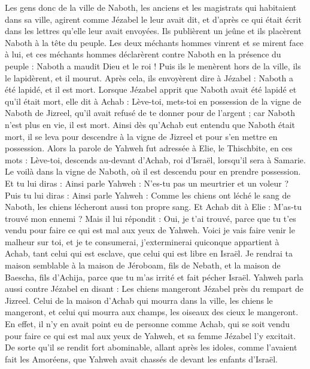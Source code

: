 \begin{multicols}{2}
Les gens donc de la ville de Naboth, les anciens et les magistrats qui habitaient dans sa ville, agirent comme Jézabel le leur avait dit, et d’après ce qui était écrit dans les lettres qu'elle leur avait envoyées.
Ils publièrent un jeûne et ils placèrent Naboth à la tête du peuple.
Les deux méchants hommes vinrent et se mirent face à lui, et ces méchants hommes déclarèrent contre Naboth en la présence du peuple : Naboth a maudit Dieu et le roi ! Puis ils le menèrent hors de la ville, ils le lapidèrent, et il mourut.
Après cela, ils envoyèrent dire à Jézabel : Naboth a été lapidé, et il est mort.
Lorsque Jézabel apprit que Naboth avait été lapidé et qu'il était mort, elle dit à Achab : Lève-toi, mets-toi en possession de la vigne de Naboth de Jizreel, qu’il avait refusé de te donner pour de l'argent ; car Naboth n'est plus en vie, il est mort.
Ainsi dès qu'Achab eut entendu que Naboth était mort, il se leva pour descendre à la vigne de Jizreel et pour s'en mettre en possession.
Alors la parole de Yahweh fut adressée à Elie, le Thischbite, en ces mots :
Lève-toi, descends au-devant d'Achab, roi d'Israël, lorsqu'il sera à Samarie. Le voilà dans la vigne de Naboth, où il est descendu pour en prendre possession.
Et tu lui diras : Ainsi parle Yahweh : N’es-tu pas un meurtrier et un voleur ? Puis tu lui diras : Ainsi parle Yahweh : Comme les chiens ont léché le sang de Naboth, les chiens lécheront aussi ton propre sang.
Et Achab dit à Elie : M'as-tu trouvé mon ennemi ? Mais il lui répondit : Oui, je t'ai trouvé, parce que tu t'es vendu pour faire ce qui est mal aux yeux de Yahweh.
Voici je vais faire venir le malheur sur toi, et je te consumerai, j’exterminerai quiconque appartient à Achab, tant celui qui est esclave, que celui qui est libre en Israël.
Je rendrai ta maison semblable à la maison de Jéroboam, fils de Nebath, et la maison de Baescha, fils d'Achija, parce que tu m'as irrité et fait pécher Israël.
Yahweh parla aussi contre Jézabel en disant : Les chiens mangeront Jézabel près du rempart de Jizreel.
Celui de la maison d’Achab qui mourra dans la ville, les chiens le mangeront, et celui qui mourra aux champs, les oiseaux des cieux le mangeront.
En effet, il n'y en avait point eu de personne comme Achab, qui se soit vendu pour faire ce qui est mal aux yeux de Yahweh, et sa femme Jézabel l’y excitait.
De sorte qu'il se rendit fort abominable, allant après les idoles, comme l'avaient fait les Amoréens, que Yahweh avait chassés de devant les enfants d'Israël.

\end{multicols}
